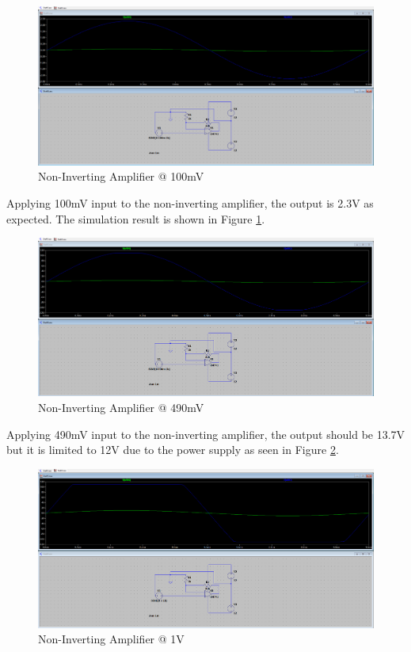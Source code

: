 \begin{figure}[h]
    \centering
    \includegraphics[width=1\textwidth]{assets/100m-non-inverting.png}
    \caption{Non-Inverting Amplifier @ 100mV}
    \label{fig:100m-non-inverting}
\end{figure}

Applying 100mV input to the non-inverting amplifier, the output is 2.3V as expected. The simulation result is shown in Figure \ref{fig:100m-non-inverting}. 

\begin{figure}[h]
    \centering
    \includegraphics[width=1\textwidth]{assets/490m-non-inverting.png}
    \caption{Non-Inverting Amplifier @ 490mV}
    \label{fig:490m-non-inverting}
\end{figure}

Applying 490mV input to the non-inverting amplifier, the output should be 13.7V but it is limited to 12V due to the power supply as seen in Figure \ref{fig:490m-non-inverting}.

\newpage
\thispagestyle{plain}

\begin{figure}[h]
    \centering
    \includegraphics[width=1\textwidth]{assets/1-non-inverting.png}
    \caption{Non-Inverting Amplifier @ 1V}
    \label{fig:1-non-inverting}
\end{figure}

